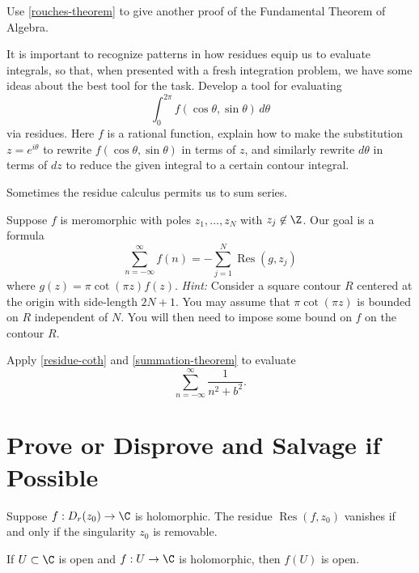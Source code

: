 \documentclass{homework}
\DeclareMathOperator{\Res}{Res}
\begin{document}
\begin{problem}
  Use \ref{rouches-theorem} to give another proof of the Fundamental Theorem of Algebra.
\end{problem}

\begin{problem}
  It is important to recognize patterns in how residues equip us to evaluate integrals, so that, when presented with a fresh integration problem, we have some ideas about the best tool for the task.  Develop a tool for evaluating
  \[
    \int_0^{2\pi} f(\cos \theta,\sin \theta) \, d\theta
  \]
  via residues.  Here $f$ is a rational function, explain how to make
  the substitution $z = e^{i\theta}$ to rewrite
  $f(\cos \theta,\sin \theta)$ in terms of $z$, and
  similarly rewrite $d\theta$ in terms of
  $dz$ to reduce the given integral to a certain contour integral.
\end{problem}

\begin{problem}\label{summation-theorem}Sometimes the residue calculus
  permits us to sum series.

  Suppose $f$ is meromorphic with poles $z_1,\ldots,z_N$ with $z_j \not\in \Z$.  Our goal is a formula
  \[
    \sum_{n=-\infty}^{\infty} f(n) = - \sum_{j=1}^N \Res(g, z_j)
  \]
  where $g(z) = \pi \cot(\pi z) f(z)$.  \textit{Hint:} Consider a square contour $R$ centered at the origin with side-length $2N+1$.  You may assume that $\pi \cot(\pi z)$ is bounded on $R$ independent of $N$.  You will then need to impose some bound on $f$ on the contour $R$.
\end{problem}

\begin{problem}
  Apply \ref{residue-coth} and \ref{summation-theorem} to evaluate
  \[
    \sum_{n=-\infty}^\infty \frac{1}{n^2 + b^2}.
  \]
\end{problem}

\section{Prove or Disprove and Salvage if Possible}

\begin{problem}\label{zero-residue-not-enough}Suppose $f : D_r(z_0) \to \C$ is holomorphic.  The residue
  $\Res(f,z_0)$ vanishes if and only if the singularity $z_0$ is
  removable.
\end{problem}

\begin{problem}\label{open-mapping-theorem}If $U \subset \C$ is open
  and $f : U \to \C$ is holomorphic, then $f(U)$ is
  open. %
\end{problem}
\end{document}
